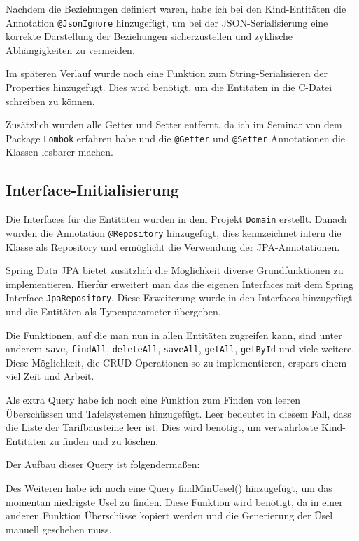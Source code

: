 Nachdem die Beziehungen definiert waren, habe ich bei den Kind-Entitäten die Annotation \texttt{@JsonIgnore} hinzugefügt, 
um bei der JSON-Serialisierung eine korrekte Darstellung der Beziehungen sicherzustellen und zyklische Abhängigkeiten zu vermeiden.

Im späteren Verlauf wurde noch eine Funktion zum String-Serialisieren der Properties hinzugefügt. Dies wird benötigt, um die Entitäten in die C-Datei schreiben zu können.

Zusätzlich wurden alle Getter und Setter entfernt, da ich im Seminar von dem Package \texttt{Lombok} erfahren habe und 
die \texttt{@Getter} und \texttt{@Setter} Annotationen die Klassen lesbarer machen.

\subsection{Interface-Initialisierung}
Die Interfaces für die Entitäten wurden in dem Projekt \texttt{Domain} erstellt. 
Danach wurden die Annotation \texttt{@Repository} hinzugefügt, dies kennzeichnet intern die Klasse als Repository und ermöglicht die Verwendung der JPA-Annotationen. 

Spring Data JPA bietet zusätzlich die Möglichkeit diverse Grundfunktionen zu implementieren. Hierfür erweitert man das die eigenen Interfaces mit dem Spring Interface \texttt{JpaRepository}. 
Diese Erweiterung wurde in den Interfaces hinzugefügt und die Entitäten als Typenparameter übergeben.

Die Funktionen, auf die man nun in allen Entitäten zugreifen kann, sind unter anderem \texttt{save}, \texttt{findAll}, \texttt{deleteAll}, \texttt{saveAll}, \texttt{getAll}, \texttt{getById} und viele weitere.
Diese Möglichkeit, die CRUD-Operationen so zu implementieren, erspart einem viel Zeit und Arbeit.

Als extra Query habe ich noch eine Funktion zum Finden von leeren Überschüssen und Tafelsystemen hinzugefügt. Leer bedeutet in diesem Fall, dass die Liste der Tarifbausteine leer ist.
Dies wird benötigt, um verwahrloste Kind-Entitäten zu finden und zu löschen.

Der Aufbau dieser Query ist folgendermaßen:



Des Weiteren habe ich noch eine Query findMinUesel() hinzugefügt, um das momentan niedrigste Üsel zu finden.
Diese Funktion wird benötigt, da in einer anderen Funktion Überschüsse kopiert werden und die Generierung der Üsel 
manuell geschehen muss. 

